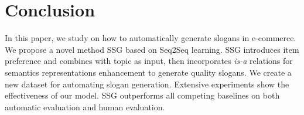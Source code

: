 \section{Conclusion}
\label{sec:conclusion}

In this paper, we study on how to 
automatically generate slogans in e-commerce.
We propose a novel method SSG
based on Seq2Seq learning.
SSG introduces item preference 
and combines with topic as input,
then  incorporates \emph{is-a} relations for semantics representations enhancement to generate quality slogans.
We create a new dataset for automating slogan generation.
Extensive experiments show the effectiveness of our model.
SSG outperforms all competing baselines on both automatic evaluation and human evaluation.

